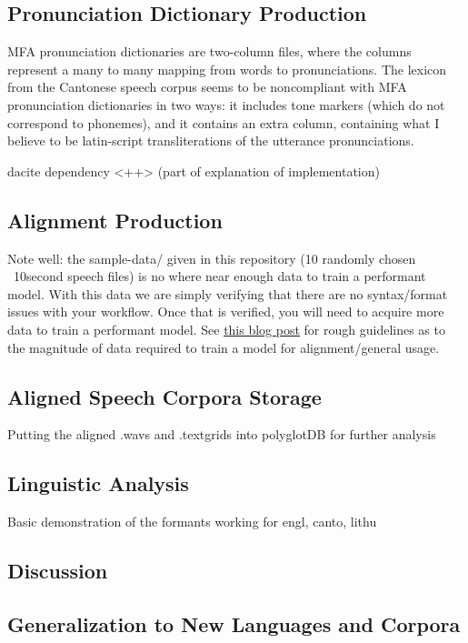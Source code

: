 \documentclass[11pt]{article}
\begin{document}
\subsection{Pronunciation Dictionary Production}

MFA pronunciation dictionaries are two-column files, where the columns represent a many to many mapping from words to pronunciations. The lexicon from the Cantonese speech corpus seems to be noncompliant with MFA pronunciation dictionaries in two ways: it includes tone markers (which do not correspond to phonemes), and it contains an extra column, containing what I believe to be latin-script transliterations of the utterance pronunciations.

dacite dependency <++> (part of explanation of implementation)

\subsection{Alignment Production}

Note well: the sample-data/ given in this repository (10 randomly chosen ~10second speech files) is no where near enough data to train a performant model. With this data we are simply verifying that there are no syntax/format issues with your workflow. Once that is verified, you will need to acquire more data to train a performant model. See \href{https://memcauliffe.com/how-much-data-do-you-need-for-a-good-mfa-alignment.html}{this blog post} for rough guidelines as to the magnitude of data required to train a model for alignment/general usage.


\subsection{Aligned Speech Corpora Storage}

Putting the aligned .wavs and .textgrids into polyglotDB for further analysis

\subsection{Linguistic Analysis}

Basic demonstration of the formants working for engl, canto, lithu

\subsection{Discussion}

\subsection{Generalization to New Languages and Corpora}
\end{document}
